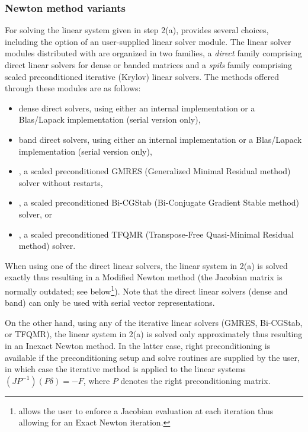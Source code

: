 \subsubsection*{Newton method variants}
For solving the linear system given in step 2(a), {\kinsol} provides
several choices, including the option of an user-supplied
linear solver module. The linear solver modules distributed with {\sundials}
are organized in two families, a {\em direct} family comprising direct linear 
solvers for dense or banded matrices and a {\em spils} family comprising
scaled preconditioned iterative (Krylov) linear solvers. 
The methods offered through these modules are as follows:
\begin{itemize}
\item dense direct solvers, using either an internal implementation or 
  a Blas/Lapack implementation (serial version only),
\item band direct solvers, using either an internal implementation or 
  a Blas/Lapack implementation (serial version only),
\item {\spgmr}, a scaled preconditioned GMRES (Generalized Minimal Residual method)
  solver without restarts,
\item {\spbcg}, a scaled preconditioned Bi-CGStab (Bi-Conjugate Gradient Stable
  method) solver, or
\item {\sptfqmr}, a scaled preconditioned TFQMR (Transpose-Free Quasi-Minimal
  Residual method) solver.
\end{itemize}
When using one of the direct linear solvers, the linear system in 2(a) is 
solved exactly thus resulting in a Modified Newton method (the Jacobian matrix 
is normally outdated; see below\footnote{{\kinsol} allows the user to enforce 
a Jacobian evaluation at each iteration thus allowing for an Exact Newton iteration.}). 
Note that the direct linear solvers (dense and band) can only be used with 
serial vector representations.

On the other hand, using any of the iterative linear solvers (GMRES, Bi-CGStab, or TFQMR), 
the linear system in 2(a) is solved only approximately thus resulting in an Inexact Newton  
method.
In the latter case, right preconditioning is available if the preconditioning setup and 
solve routines are supplied by the user, in which case the iterative method is applied 
to the linear systems $(JP^{-1})(P\delta) = -F$, where $P$ denotes the right preconditioning 
matrix.


